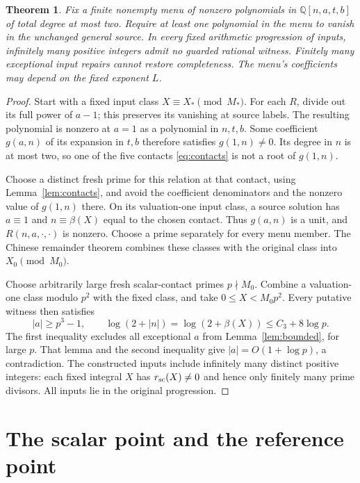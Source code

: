 \documentclass[11pt,a4paper]{article}
\newtheorem{theorem}{Theorem}[section]
\newcommand{\Q}{\mathbb Q}\newcommand{\Z}{\mathbb Z}
\begin{document}
\begin{theorem}\label{thm:quadratic}
Fix a finite nonempty menu of nonzero polynomials in
$\Q[n,a,t,b]$ of total degree at most two. Require at least one
polynomial in the menu to vanish in the unchanged general source.
In every fixed arithmetic progression of inputs, infinitely many
positive integers admit no guarded rational witness. Finitely many
exceptional input repairs cannot restore completeness. The menu's
coefficients may depend on the fixed exponent $L$.
\end{theorem}
\begin{proof}
Start with a fixed input class $X\equiv X_*\pmod{M_*}$.
For each $R$, divide out its full power of $a-1$; this preserves
its vanishing at source labels. The resulting polynomial is
nonzero at $a=1$ as a polynomial in $n,t,b$. Some coefficient
$g(a,n)$ of its expansion in $t,b$ therefore satisfies
$g(1,n)\ne0$. Its degree in $n$ is at most two, so one of the
five contacts \eqref{eq:contacts} is not a root of $g(1,n)$.

Choose a distinct fresh prime for this relation at that contact,
using Lemma~\ref{lem:contacts}, and avoid the coefficient
denominators and the nonzero value of $g(1,n)$ there.
On its valuation-one input class, a source solution has
$a\equiv1$ and $n\equiv\beta(X)$ equal to the chosen contact.
Thus $g(a,n)$ is a unit, and $R(n,a,\cdot,\cdot)$ is nonzero.
Choose a prime separately for every menu member. The Chinese
remainder theorem combines these classes with the original class
into $X_0\pmod{M_0}$.

Choose arbitrarily large fresh scalar-contact primes $p\nmid M_0$.
Combine a valuation-one class modulo $p^2$ with the fixed class,
and take $0\le X<M_0p^2$. Every putative witness then satisfies
\[
 |a|\ge p^3-1,\qquad
 \log(2+|n|)=\log(2+\beta(X))\le C_3+8\log p.
\]
The first inequality excludes all exceptional $a$ from
Lemma~\ref{lem:bounded}, for large $p$. That lemma and the second
inequality give $|a|=O(1+\log p)$, a contradiction.
The constructed inputs include infinitely many distinct positive
integers: each fixed integral $X$ has $r_{\rm sc}(X)\ne0$ and
hence only finitely many prime divisors. All inputs lie in the
original progression.
\end{proof}

\section{The scalar point and the reference point}
\end{document}
